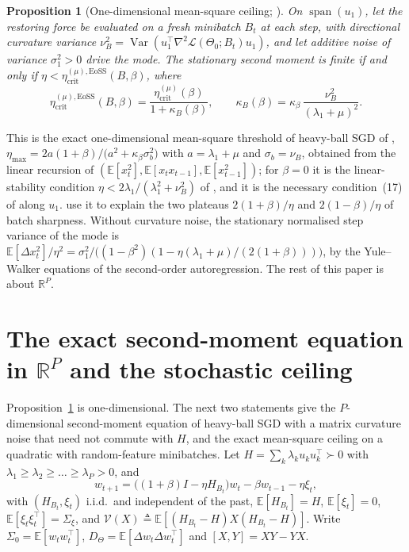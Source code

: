 \documentclass[11pt]{article}
\newtheorem{proposition}[theorem]{Proposition}
\theoremstyle{remark}
\newcommand{\etacrit}{\eta_{\mathrm{crit}}}
\newcommand{\E}{\mathbb{E}}
\newcommand{\R}{\mathbb{R}}
\newcommand{\Var}{\operatorname{Var}}
\begin{document}
\begin{proposition}[One-dimensional mean-square ceiling; \citealt{wu2018sgd,andreyev2026momentum}]\label{prop:oneD}
On $\operatorname{span}(u_1)$, let the restoring force be evaluated on a fresh minibatch $B_t$ at each step, with directional curvature variance $\nu_B^2=\Var(u_1^\top\nabla^2\mathcal L(\Theta_0;B_t)u_1)$, and let additive noise of variance $\sigma_1^2>0$ drive the mode. The stationary second moment is finite if and only if $\eta<\etacrit^{(\mu),\mathrm{EoSS}}(B,\beta)$, where
\begin{equation}\label{eq:eoss}
\etacrit^{(\mu),\mathrm{EoSS}}(B,\beta)=\frac{\etacrit^{(\mu)}(\beta)}{1+\kappa_B(\beta)},\qquad
\kappa_B(\beta)=\kappa_\beta\,\frac{\nu_B^2}{(\lambda_1+\mu)^2}.
\end{equation}
\end{proposition}
This is the exact one-dimensional mean-square threshold of heavy-ball SGD of \citet[Section~4.1 and Appendix~B]{andreyev2026momentum}, $\eta_{\max}=2a(1+\beta)/\big(a^2+\kappa_\beta\sigma_b^2\big)$ with $a=\lambda_1+\mu$ and $\sigma_b=\nu_B$, obtained from the linear recursion of $(\E[x_t^2],\E[x_tx_{t-1}],\E[x_{t-1}^2])$; for $\beta=0$ it is the linear-stability condition $\eta<2\lambda_1/(\lambda_1^2+\nu_B^2)$ of \citet{wu2018sgd}, and it is the necessary condition~(17) of \citet{mulayoff2024exact} along $u_1$. \citet{andreyev2026momentum} use it to explain the two plateaus $2(1+\beta)/\eta$ and $2(1-\beta)/\eta$ of batch sharpness. Without curvature noise, the stationary normalised step variance of the mode is $\E[\Delta x_t^2]/\eta^2=\sigma_1^2/\big((1-\beta^2)(1-\eta(\lambda_1+\mu)/(2(1+\beta)))\big)$, by the Yule--Walker equations of the second-order autoregression. The rest of this paper is about $\R^P$.


\section{The exact second-moment equation in \texorpdfstring{$\R^P$}{R\^P} and the stochastic ceiling}\label{sec:lyapunov}

Proposition~\ref{prop:oneD} is one-dimensional. The next two statements give the $P$-dimensional second-moment equation of heavy-ball SGD with a matrix curvature noise that need not commute with $H$, and the exact mean-square ceiling on a quadratic with random-feature minibatches. Let $H=\sum_k\lambda_ku_ku_k^\top\succ0$ with $\lambda_1\ge\lambda_2\ge\dots\ge\lambda_P>0$, and
\begin{equation}\label{eq:hbP}
w_{t+1}=\big((1+\beta)I-\eta H_{B_t}\big)w_t-\beta w_{t-1}-\eta\xi_t,
\end{equation}
with $(H_{B_t},\xi_t)$ i.i.d.\ and independent of the past, $\E[H_{B_t}]=H$, $\E[\xi_t]=0$, $\E[\xi_t\xi_t^\top]=\Sigma_\xi$, and $\mathcal V(X)\triangleq\E[(H_{B_t}-H)X(H_{B_t}-H)]$. Write $\Sigma_0=\E[w_tw_t^\top]$, $D_\Theta=\E[\Delta w_t\Delta w_t^\top]$ and $[X,Y]=XY-YX$.
\end{document}
